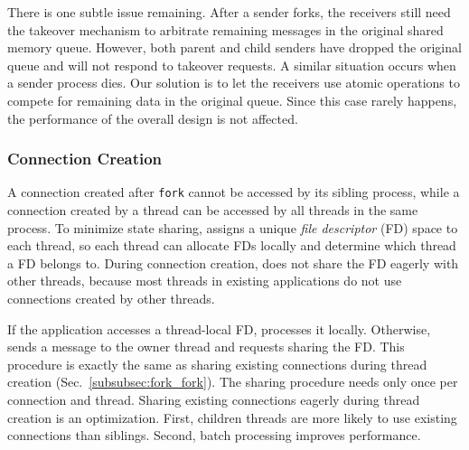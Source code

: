 There is one subtle issue remaining. After a sender forks, the receivers still need the takeover mechanism to arbitrate remaining messages in the original shared memory queue. However, both parent and child senders have dropped the original queue and will not respond to takeover requests. A similar situation occurs when a sender process dies. Our solution is to let the receivers use atomic operations to compete for remaining data in the original queue. Since this case rarely happens, the performance of the overall design is not affected.



\subsubsection{Connection Creation}
\label{subsubsec:fork_new}

A connection created after \texttt{fork} cannot be accessed by its sibling process, while a connection created by a thread can be accessed by all threads in the same process. To minimize state sharing, \libipc assigns a unique \textit{file descriptor} (FD) space to each thread, so each thread can allocate FDs locally and determine which thread a FD belongs to. During connection creation, \libipc does not share the FD eagerly with other threads, because most threads in existing applications do not use connections created by other threads.

If the application accesses a thread-local FD, \libipc processes it locally. Otherwise, \libipc sends a message to the owner thread and requests sharing the FD. This procedure is exactly the same as sharing existing connections during thread creation (Sec.~\ref{subsubsec:fork_fork}). The sharing procedure needs only once per connection and thread. Sharing existing connections eagerly during thread creation is an optimization. First, children threads are more likely to use existing connections than siblings. Second, batch processing improves performance.

